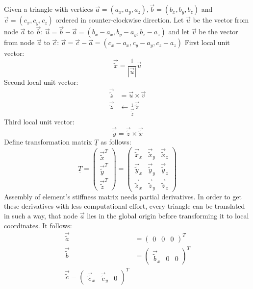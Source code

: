   Given a triangle with vertices $\vec{a} = (a_x, a_y, a_z), \vec{b} = (b_x, b_y, b_z)$ and $\vec{c} = (c_x, c_y, c_z)$ ordered in counter-clockwise direction. Let $\vec{u}$ be the vector from node $\vec{a}$ to $\vec{b}$: $\vec{u} = \vec{b}-\vec{a} = (b_x - a_x, b_y - a_y,b_z - a_z)$ and let $\vec{v}$ be the vector from node $\vec{a}$ to $\vec{c}$: $\vec{a} = \vec{c}-\vec{a} = (c_x - a_x, c_y - a_y, c_z - a_z)$
  First local unit vector:
  \begin{equation}
   \vec{\tilde{x}} = \frac{1}{\left|\vec{u}\right|}\vec{u} \nonumber
  \end{equation}
  Second local unit vector:
  \begin{align}
   \vec{\tilde{z}} &= \vec{u} \times \vec{v} \nonumber\\
   \vec{\tilde{z}} &\leftarrow \frac{1}{\vec{\tilde{z}}}\vec{\tilde{z}} \nonumber
  \end{align}
  Third local unit vector:
  \begin{equation}
   \vec{\tilde{y}} = \vec{\tilde{z}} \times \vec{\tilde{x}} \nonumber
  \end{equation}
  Define transformation matrix $\underline{T}$ as follows:
  \begin{equation}
   \underline{T} = \begin{pmatrix}
   \vec{\tilde{x}}^T\\ \vec{\tilde{y}}^T\\ \vec{\tilde{z}}^T
   \end{pmatrix} = \begin{pmatrix}
   \vec{\tilde{x}}_x & \vec{\tilde{x}}_y & \vec{\tilde{x}}_z\\ \vec{\tilde{y}}_x & \vec{\tilde{y}}_y & \vec{\tilde{y}}_z\\ \vec{\tilde{z}}_x & \vec{\tilde{z}}_y & \vec{\tilde{z}}_z
   \end{pmatrix}
  \end{equation}
  Assembly of element's stiffness matrix needs partial derivatives. In order to get these derivatives with less computational effort, every triangle can be translated in such a way, that node $\vec{a}$ lies in the global origin before transforming it to local coordinates. It follows:
  \begin{align}
   \vec{\tilde{a}} &= \begin{pmatrix}
   0 & 0 & 0
   \end{pmatrix}^T \nonumber\\
   \vec{\tilde{b}} &= \begin{pmatrix}
   \vec{\tilde{b}}_x & 0 & 0
   \end{pmatrix}^T \nonumber\\
   \vec{\tilde{c}} = \begin{pmatrix}
   \vec{\tilde{c}}_x & \vec{\tilde{c}}_y & 0
   \end{pmatrix}^T
  \end{align}
